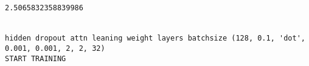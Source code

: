 \documentclass[11pt]{article}
\begin{document}
    \begin{center}
    \end{center}
    { \hspace*{\fill} \\}
    
    \begin{center}
    \end{center}
    { \hspace*{\fill} \\}
    
    \begin{center}
    \end{center}
    { \hspace*{\fill} \\}
    
    \begin{center}
    \end{center}
    { \hspace*{\fill} \\}
    
    \begin{Verbatim}[commandchars=\\\{\}]
2.5065832358839986


hidden dropout attn leaning weight layers batchsize (128, 0.1, 'dot', 0.001, 0.001, 2, 2, 32)
START TRAINING



    \end{Verbatim}

    \begin{center}
    \end{center}
    { \hspace*{\fill} \\}
    
    \begin{center}
    \end{center}
    { \hspace*{\fill} \\}
    
    \begin{center}
    \end{center}
    { \hspace*{\fill} \\}
    
\end{document}
